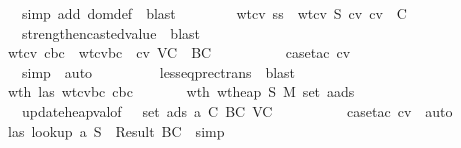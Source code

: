 \begin{isabellebody}
\ \ \ \ \ \ \ \ \isamarkupfalse \ {\isacharparenleft}simp\ add{\isacharcolon}\ dom{\isacharunderscore}def{\isacharparenright}\ \isamarkupfalse \ blast\ \isamarkupfalse \isanewline
\ \ \ \ \ \ \isamarkupfalse \ wtcv\ ss{}\ \isamarkupfalse \ wtcv{}{\isacharcolon}\ {\isachardoublequoteopen}{\isacharquery}S{}\ {\isasymturnstile}cv\ cv\ {\isacharcolon}\ C{\isachardoublequoteclose}\isanewline
\ \ \ \ \ \ \ \ \isamarkupfalse \ strengthen{\isacharunderscore}casted{\isacharunderscore}value\ \isamarkupfalse \ blast\ \isamarkupfalse \isanewline
\ \ \ \ \ \ \isamarkupfalse \ wtcv\ cbc\ \isamarkupfalse \ wtcvbc{\isacharcolon}\ {\isachardoublequoteopen}{\isasymSigma}\ {\isasymturnstile}cv\ {\isacharquery}VC\ {\isacharcolon}\ BC{\isachardoublequoteclose}\ \isanewline
\ \ \ \ \ \ \ \ \isamarkupfalse \ {\isacharparenleft}case{\isacharunderscore}tac\ cv{\isacharparenright}\isanewline
\ \ \ \ \ \ \ \ \isamarkupfalse \ simp\ \isamarkupfalse \ auto\isanewline
\ \ \ \ \ \ \ \ \isamarkupfalse \ lesseq{\isacharunderscore}prec{\isacharunderscore}trans\ \isamarkupfalse \ blast\ \isamarkupfalse \ \ \ \ \ \ \ \ \isanewline
\ \ \ \ \ \ \isamarkupfalse \ wth\ las\ wtcvbc\ cbc\isanewline
\ \ \ \ \ \ \isamarkupfalse \ wth{}{\isacharcolon}\ {\isachardoublequoteopen}wt{\isacharunderscore}heap\ {\isacharquery}S{}\ {\isacharquery}M{}\ {\isacharparenleft}set\ {\isacharparenleft}a{\isacharhash}ads{}{\isacharparenright}{\isacharparenright}{\isachardoublequoteclose}\isanewline
\ \ \ \ \ \ \ \ \isamarkupfalse \ update{\isacharunderscore}heap{\isacharunderscore}val{\isacharbrackleft}of\ {\isasymSigma}\ {\isasymmu}\ {\isachardoublequoteopen}set\ ads{}{\isachardoublequoteclose}\ a\ C\ BC\ {\isacharquery}VC{\isacharbrackright}\ \isanewline
\ \ \ \ \ \ \ \ \isamarkupfalse \ {\isacharparenleft}case{\isacharunderscore}tac\ cv{\isacharparenright}\ \isamarkupfalse \ auto\ \isamarkupfalse \isanewline
\ \ \ \ \ \ \isamarkupfalse \ las{}{\isacharcolon}\ {\isachardoublequoteopen}lookup\ a\ {\isacharquery}S{}\ {\isacharequal}\ Result\ BC{\isachardoublequoteclose}\ \isamarkupfalse \ simp\isanewline

\end{isabellebody}
